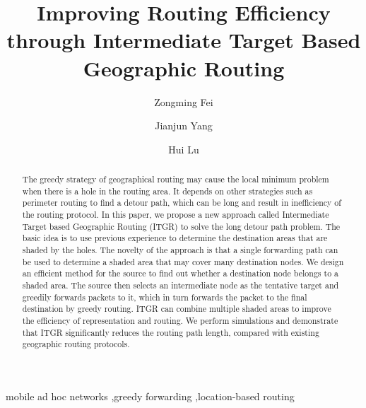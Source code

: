 \documentclass[3p,times]{elsarticle}
\begin{document}
\begin{frontmatter}





\dochead{}


\title{Improving Routing Efficiency through Intermediate Target Based Geographic Routing}




\author[label1]{Zongming Fei}
\address[label1]{{\bf Corresponding Author,} Department of Computer Science, University of Kentucky, Lexington,KY. Email: fei@netlab.uky.edu}
\author[label2]{Jianjun Yang}
 \address[label2]{Department of Computer Science and Information Systems, University of North Georgia, Oakwood, GA. Email: jianjun.yang@ung.edu}
\author[label3]{Hui Lu}
\address[label3]{School of Electronic and Information Engineering, Beihang University, \\
Beijing 100191, China, Email: luhui.buaa@gmail.com }




\address{}

\begin{abstract}
The greedy strategy of geographical routing may cause the local minimum problem
when there is a hole in the routing area. It depends on other strategies such
as perimeter routing to find a detour path, which can be long and result in
inefficiency of the routing protocol. In this paper, we propose a new approach
called Intermediate Target based Geographic Routing (ITGR) to solve the long
detour path problem. The basic idea is to use previous experience to determine
the destination areas that are shaded by the holes. The novelty of the approach
is that a single forwarding path can be used to determine a shaded area that
may cover many destination nodes. We design an efficient method for the source
to find out whether a destination node belongs to a shaded area. The source
then selects an intermediate node as the tentative target and greedily forwards
packets to it, which in turn forwards the packet to the final destination by
greedy routing. ITGR can combine multiple shaded areas to improve the
efficiency of representation and routing. We perform simulations and demonstrate
that ITGR significantly reduces the routing path length, compared with existing
geographic routing protocols.
\end{abstract}

\begin{keyword}
mobile ad hoc networks \sep greedy forwarding \sep location-based routing




\end{keyword}

\end{frontmatter}
\end{document}
